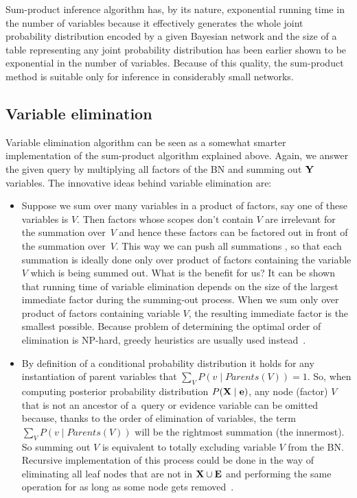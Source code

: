 \documentclass[english,cover]{fitthesis} %
\newcommand{\vars}[1]{{\bold{#1}}}         %
\begin{document}
Sum-product inference algorithm has, by its nature, exponential running time in the number of variables because it effectively generates the whole joint probability distribution encoded by a given Bayesian network and the size of a table representing any joint probability distribution has been earlier shown to be exponential in the number of variables. Because of this quality, the sum-product method is suitable only for inference in considerably small networks.



\subsection{Variable elimination}
Variable elimination algorithm can be seen as a somewhat smarter implementation of the sum-product algorithm explained above. Again, we answer the given query by multiplying all factors of the BN and summing out $\vars{Y}$ variables. The innovative ideas behind variable elimination are:
\begin{itemize}
	\item Suppose we sum over many variables in a product of factors, say one of these variables is $V$. Then factors whose scopes don't contain $V$ are irrelevant for the summation over~$V$ and hence these factors can be factored out in front of the summation over~$V$. This way we can push all summations , so that each summation is ideally done only over product of factors containing the variable $V$ which is being summed out. What is the benefit for us? It can be shown~\cite{pgm} that running time of variable elimination depends on the size of the largest immediate factor during the summing-out process. When we sum only over product of factors containing variable $V$, the resulting immediate factor is the smallest possible. Because problem of determining the optimal order of elimination is NP-hard, greedy heuristics are usually used instead~\cite{pgm}.
	\item By definition of a conditional probability distribution it holds for any instantiation of parent variables that $\sum_V P(v \mid Parents(V)) = 1$. So, when computing posterior probability distribution $P(\vars{X} \mid \vars{e})$, any node (factor) $V$ that is not an ancestor of a~query or evidence variable can be omitted because, thanks to the order of elimination of variables, the term $\sum_V P(v \mid Parents(V))$ will be the rightmost summation (the innermost). So summing out $V$ is equivalent to totally excluding variable $V$ from the BN. Recursive implementation of this process could be done in the way of eliminating all leaf nodes that are not in $\vars{X} \cup \vars{E}$ and performing the same operation for as long as some node gets removed~\cite[p.~510]{russell_norvig_ed2}.
\end{itemize}
\end{document}
